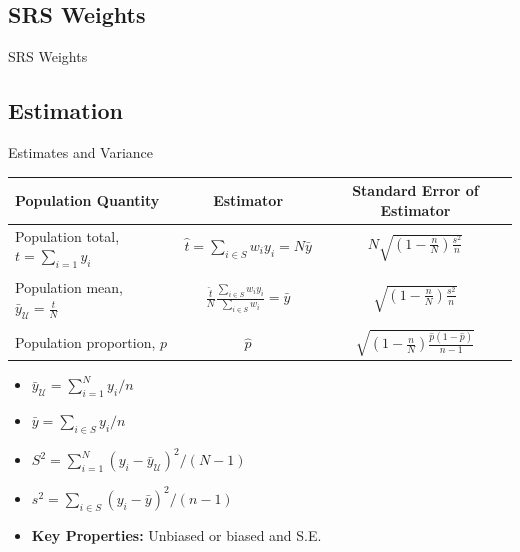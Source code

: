 \documentclass[10pt]{beamer}\usepackage[]{graphicx}\usepackage[]{xcolor}
\begin{document}
\subsection{SRS Weights}
\begin{frame}{SRS Weights}
\end{frame}

\subsection{Estimation}
\begin{frame}{Estimates and Variance}
\small
\begin{tabular}{lcc}
Population Quantity & Estimator & Standard Error of Estimator\\
\hline
Population total,  $t=\sum_{i=1} y_i$ & $\hat{t} = \sum_{i\in S} w_i y_i = N\bar{y}$&$N\sqrt{\left( 1-\frac{n}{N}\right)\frac{s^2}{n}}$\\
&&\\
Population mean, $\bar{y}_{\mathcal{U}} = \frac{t}{N}$ & $\frac{\hat{t}}{N} \frac{\sum_{i\in S} w_i y_i }{\sum_{i\in S} w_i}=\bar{y}$ & $\sqrt{\left( 1-\frac{n}{N}\right)\frac{s^2}{n}}$\\
&&\\
Population proportion, $p$ & $\hat{p}$ & $\sqrt{\left(1-\frac{n}{N}\right)\frac{\hat{p}(1-\hat{p})}{n-1}}$
\end{tabular}

\begin{itemize}
\item $\bar{y}_{\mathcal{U}} = \sum_{i=1}^N y_i/n$
\item $\bar{y} = \sum_{i \in S} y_i/n$
\item $S^2 = \sum_{i=1}^N (y_i-\bar{y}_{\mathcal{U}})^2/(N-1)$
\item $s^2 = \sum_{i \in S} (y_i-\bar{y})^2/(n-1)$
\item \textbf{Key Properties:} Unbiased or biased and S.E.
\end{itemize}
\end{frame}
\end{document}
